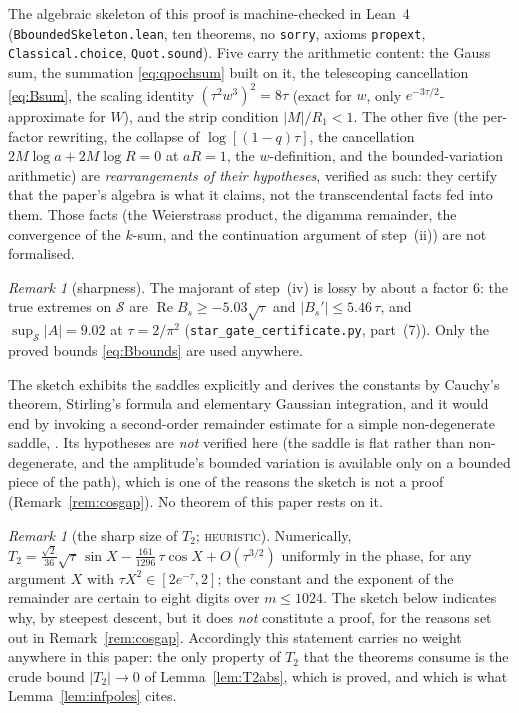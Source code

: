 \documentclass[11pt]{article}
\theoremstyle{plain}
\theoremstyle{definition}
\theoremstyle{remark}
\newtheorem{remark}[theorem]{Remark}
\renewcommand{\Re}{\operatorname{Re}}
\begin{document}
\noindent The algebraic skeleton of this proof is machine-checked in Lean~4
(\texttt{BboundedSkeleton.lean}, ten theorems, no \texttt{sorry}, axioms \texttt{propext},
\texttt{Classical.choice}, \texttt{Quot.sound}). Five carry the arithmetic content: the Gauss sum,
the summation \eqref{eq:qpochsum} built on it, the telescoping cancellation \eqref{eq:Bsum}, the
scaling identity $(\tau^2w^3)^2=8\tau$ (exact for $w$, only $e^{-3\tau/2}$-approximate for $W$),
and the strip condition $|M|/R_1<1$. The other five (the per-factor rewriting, the collapse of
$\log[(1-q)\tau]$, the cancellation $2M\log a+2M\log R=0$ at $aR=1$, the $w$-definition, and the
bounded-variation arithmetic) are \emph{rearrangements of their hypotheses}, verified as such:
they certify that the paper's algebra is what it claims, not the transcendental facts fed into
them. Those facts (the Weierstrass product, the digamma remainder, the convergence of the
$k$-sum, and the continuation argument of step~(ii)) are not formalised.

\begin{remark}[sharpness]\label{rem:Bsharp}
The majorant of step~(iv) is lossy by about a factor $6$: the true extremes on $\mathcal S$ are
$\Re B_s\ge-5.03\sqrt\tau$ and $|B_s'|\le5.46\,\tau$, and $\sup_{\mathcal S}|A|=9.02$ at
$\tau=2/\pi^2$ (\texttt{star\_gate\_certificate.py}, part~(7)). Only the proved bounds
\eqref{eq:Bbounds} are used anywhere.
\end{remark}

The sketch exhibits the saddles explicitly and derives the constants by Cauchy's theorem, Stirling's
formula and elementary Gaussian integration, and it would end by invoking a second-order remainder
estimate for a simple non-degenerate saddle, \cite[Ch.~4, Thm.~7.1]{Olver}. Its hypotheses are
\emph{not} verified here (the saddle is flat rather than non-degenerate, and the amplitude's
bounded variation is available only on a bounded piece of the path), which is one of the reasons
the sketch is not a proof (Remark~\ref{rem:cosgap}). No theorem of this paper rests on it.

\begin{remark}[the sharp size of $T_2$; \textsc{heuristic}]\label{lem:cos}
Numerically, $T_2=\tfrac{\sqrt2}{36}\sqrt\tau\,\sin X-\tfrac{161}{1296}\,\tau\cos X+O(\tau^{3/2})$
uniformly in the phase, for any argument $X$ with $\tau X^2\in[2e^{-\tau},2]$; the constant and the
exponent of the remainder are certain to eight digits over $m\le1024$. The sketch below indicates
why, by steepest descent, but it does \emph{not} constitute a proof, for the reasons set out in
Remark~\ref{rem:cosgap}. Accordingly this statement carries no weight anywhere in this paper:
the only property of $T_2$ that the theorems consume is the crude bound
$|T_2|\to0$ of Lemma~\ref{lem:T2abs}, which is proved, and which is what
Lemma~\ref{lem:infpoles} cites.
\end{remark}
\end{document}
